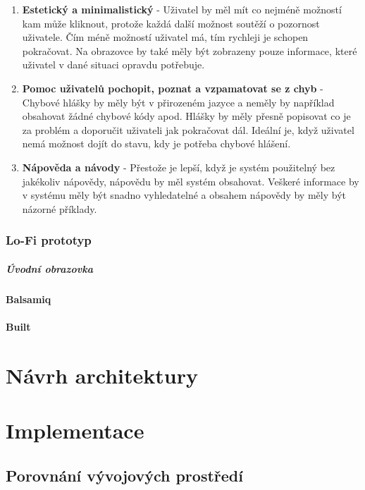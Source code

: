 \documentclass[thesis=M,czech]{FITthesis}[2012/06/26]
\begin{document}
\begin{enumerate}
	\item
	\textbf{Estetický a minimalistický} - Uživatel by měl mít co nejméně možností kam může kliknout, protože každá
	další možnost soutěží o pozornost uživatele. Čím méně možností uživatel má,
	tím rychleji je schopen pokračovat. Na obrazovce by také měly být zobrazeny
	pouze informace, které uživatel v dané situaci opravdu potřebuje.
	\item
	\textbf{Pomoc uživatelů pochopit, poznat a vzpamatovat se z chyb} - Chybové hlášky by měly být v přirozeném jazyce a neměly by například obsahovat
	žádné chybové kódy apod. Hlášky by měly přesně popisovat co je za
	problém a doporučit uživateli jak pokračovat dál. Ideální je, když uživatel
	nemá možnost dojít do stavu, kdy je potřeba chybové hlášení.
	\item
	\textbf{Nápověda a návody} - Přestože je lepší, když je systém použitelný bez jakékoliv nápovědy, nápovědu
	by měl systém obsahovat. Veškeré informace by v systému měly být snadno
	vyhledatelné a obsahem nápovědy by měly být názorné příklady.
\end{enumerate} 

\subsection{Lo-Fi prototyp}

\paragraph{Úvodní obrazovka}

\subsubsection{Balsamiq}

\subsubsection{Built}


\chapter{Návrh architektury}

\chapter{Implementace}

\section{Porovnání vývojových prostředí}
\end{document}
